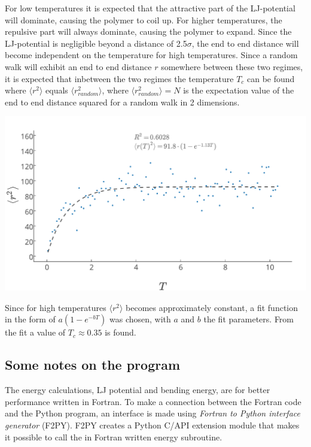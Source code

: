 For low temperatures it is expected that the attractive part of the LJ-potential will dominate, causing the polymer to coil up. For higher temperatures, the repulsive part will always dominate, causing the polymer to expand. Since the LJ-potential is negligible beyond a distance of 2.5$\sigma$, the end to end distance will become independent on the temperature for high temperatures. Since a random walk will exhibit an end to end distance $r$ somewhere between these two regimes, it is expected that inbetween the two regimes the temperature $T_c$ can be found where $\langle r^2 \rangle$ equals $\langle r_{random}^2 \rangle$, where $\langle r_{random}^2 \rangle = N$ is the expectation value of the end to end distance squared for a random walk in 2 dimensions.
\begin{Figure}
  \centerfloat
     \includegraphics[scale=0.4]{end_to_end_distance_as_function_of_the_temperature.pdf}
 \label{fig:end_to_end_afo_temperature}
\end{Figure}

Since for high temperatures $\langle r^2 \rangle$ becomes approximately constant, a fit function in the form of $a(1-e^{-bT})$ was chosen, with $a$ and $b$ the fit parameters. From the fit a value of $T_c \approx 0.35$ is found.

\subsection{Some notes on the program}
The energy calculations, LJ potential and bending energy, are for better performance written in Fortran. To make a connection between the Fortran code and the Python program, an interface is made using \emph{Fortran to Python interface generator} (F2PY). F2PY creates a Python C/API extension module that makes it possible to call the in Fortran written energy subroutine.